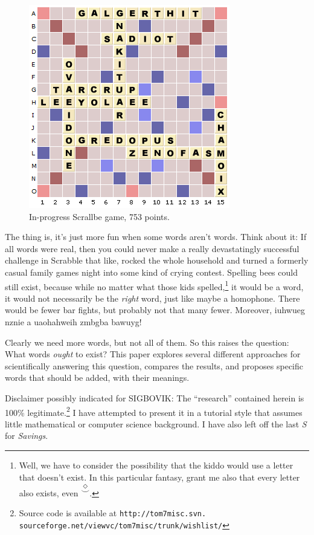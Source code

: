 \documentclass[twocolumn]{article}
\begin{document}
\begin{figure}
\begin{center}
\includegraphics[width=0.75 \linewidth]{scrallbe-screenshot}
\end{center}\vspace{-0.1in}
\caption{In-progress Scrallbe game, 753 points.}
\label{fig:scrallbe}
\end{figure}

The thing is, it's just more fun when some words aren't words. Think
about it: If all words were real, then you could never make a really
devastatingly successful challenge in Scrabble that like, rocked the
whole household and turned a formerly casual family games night into
some kind of crying contest. Spelling bees could still exist, because
while no matter what those kids spelled,\!\footnote{Well, we have to
consider the possibility that the kiddo would use a letter that
doesn't exist. In this particular fantasy, grant me also that every
letter also exists, even $\stackrel{\Diamond}{\smile}$.} it would be
a word, it would not necessarily be the {\it right} word, just like
maybe a homophone. There would be fewer bar fights, but probably not
that many fewer. Moreover, iuhwueg nznie a uaohahweih zmbgba bawuyg!

Clearly we need more words, but not all of them. So this raises the
question: What words {\it ought} to exist? This paper explores several
different approaches for scientifically answering this question,
compares the results, and proposes specific words that should be
added, with their meanings.

Disclaimer possibly indicated for SIGBOVIK: The ``research'' contained
herein is 100\% legitimate.\!\footnote{Source code is available at
{\tt http://tom7misc.svn.
sourceforge.net/viewvc/tom7misc/trunk/wishlist/}} I have attempted to
present it in a tutorial style that assumes little mathematical or
computer science background. I have also left off the last {\it S} for
{\it Savings}.
\end{document}
